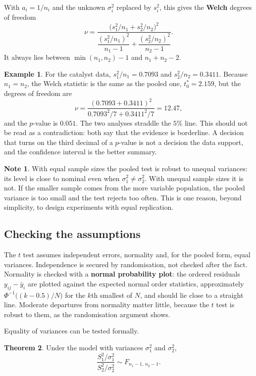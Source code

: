 \documentclass[11pt,a4paper]{article}
\numberwithin{equation}{section}
\theoremstyle{definition}
\newtheorem{thm}{Theorem}[subsection]
\newtheorem{exa}[thm]{Example}
\newtheorem*{note}{Note}
\begin{document}
With $a_i = 1/n_i$ and the unknown $\sigma_i^2$ replaced by $s_i^2$, this gives the \textbf{Welch} degrees of freedom
\[
\nu = \frac{\bigl(s_1^2/n_1 + s_2^2/n_2\bigr)^2}{\dfrac{(s_1^2/n_1)^2}{n_1 - 1} + \dfrac{(s_2^2/n_2)^2}{n_2 - 1}} .
\]
It always lies between $\min(n_1, n_2) - 1$ and $n_1 + n_2 - 2$.

\begin{exa}
For the catalyst data, $s_1^2/n_1 = 0.7093$ and $s_2^2/n_2 = 0.3411$. Because $n_1 = n_2$, the Welch statistic is the same as the pooled one, $t_0^* = 2.159$,
but the degrees of freedom are
\[
\nu = \frac{(0.7093 + 0.3411)^2}{0.7093^2/7 + 0.3411^2/7} = 12.47 ,
\]
and the $p$-value is $0.051$. The two analyses straddle the $5\%$ line. This should not be read as a contradiction: both say that the evidence is
borderline. A decision that turns on the third decimal of a $p$-value is not a decision the data support, and the confidence interval is the better
summary.
\end{exa}

\begin{note}
With equal sample sizes the pooled test is robust to unequal variances: its level is close to nominal even when $\sigma_1^2 \ne \sigma_2^2$. With
unequal sample sizes it is not. If the smaller sample comes from the more variable population, the pooled variance is too small and the test
rejects too often. This is one reason, beyond simplicity, to design experiments with equal replication.
\end{note}

\subsection{Checking the assumptions}
The $t$ test assumes independent errors, normality and, for the pooled form, equal variances. Independence is secured by randomisation, not
checked after the fact. Normality is checked with a \textbf{normal probability plot}: the ordered residuals $y_{ij} - \bar y_i$ are plotted against the
expected normal order statistics, approximately $\Phi^{-1}\bigl((k - 0.5)/N\bigr)$ for the $k$th smallest of $N$, and should lie close to a straight line.
Moderate departures from normality matter little, because the $t$ test is robust to them, as the randomisation argument shows.

Equality of variances can be tested formally.

\begin{thm}\label{thm:F-variances}
Under the model with variances $\sigma_1^2$ and $\sigma_2^2$,
\[
\frac{S_1^2/\sigma_1^2}{S_2^2/\sigma_2^2} \sim F_{n_1-1,\,n_2-1} .
\]
\end{thm}
\end{document}

